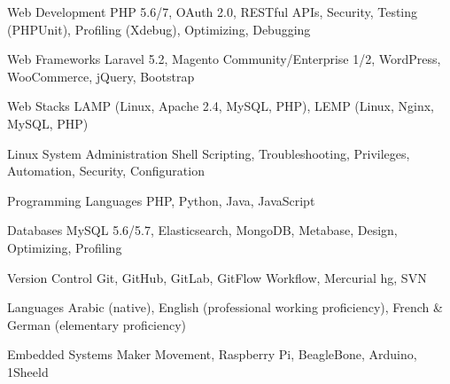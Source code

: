 


\begin{cvskills}



  \cvskill
    {Web Development} %
    {PHP 5.6/7, OAuth 2.0, RESTful APIs, Security, Testing (PHPUnit), Profiling (Xdebug), Optimizing, Debugging} %


  \cvskill
    {Web Frameworks} %
    {Laravel 5.2, Magento Community/Enterprise 1/2, WordPress, WooCommerce, jQuery, Bootstrap} %


  \cvskill
    {Web Stacks} %
    {LAMP (Linux, Apache 2.4, MySQL, PHP), LEMP (Linux, Nginx, MySQL, PHP)} %


  \cvskill
    {Linux System Administration} %
    {Shell Scripting, Troubleshooting, Privileges, Automation, Security, Configuration} %


  \cvskill
    {Programming Languages} %
    {PHP, Python, Java, JavaScript} %


  \cvskill
    {Databases} %
    {MySQL 5.6/5.7, Elasticsearch, MongoDB, Metabase, Design, Optimizing, Profiling} %


  \cvskill
    {Version Control} %
    {Git, GitHub, GitLab, GitFlow Workflow, Mercurial hg, SVN} %


  \cvskill
    {Languages} %
    {Arabic (native), English (professional working proficiency), French \& German (elementary proficiency)} %


  \cvskill
    {Embedded Systems} %
    {Maker Movement, Raspberry Pi, BeagleBone, Arduino, 1Sheeld} %


\end{cvskills}


